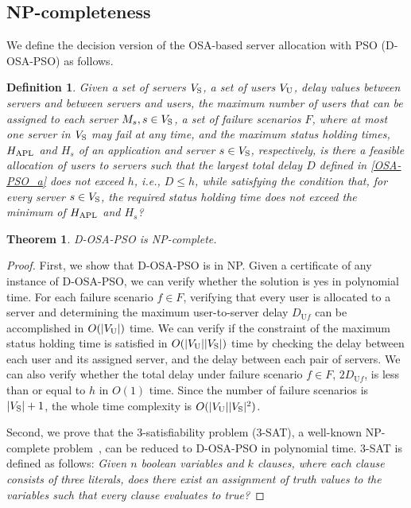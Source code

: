 \documentclass[conference]{IEEEtran}
\newtheorem{thm}{Theorem} %
\newtheorem{definition}{Definition}
\begin{document}
\begin{CJK}{UTF8}{ipxm}
\section{NP-completeness}
\label{sec:NP-Completeness}

We define the decision version of the OSA-based server allocation with PSO (D-OSA-PSO) as follows.
\begin{definition}
    Given a set of servers $V_{\rm{S}}$, a set of users $V_{\rm{U}}$, delay values between servers and between servers and users, the maximum number of users that can be assigned to each server $M_s, s \in V_{\rm{S}}$, a set of failure scenarios $F$, where at most one server in $V_{\rm{S}}$ may fail at any time, 
    and the maximum status holding times, $H_{\rm APL}$ and $H_s$ of an application and server $s \in V_{\rm{S}}$, respectively, 
    is there a feasible allocation of users to servers such that the largest total delay $D$ defined in \eqref{OSA-PSO_a} does not exceed $h$, i.e., $D \leq h$, while satisfying the condition that, for every server $s \in V_{\rm{S}}$, the required status holding time does not exceed the minimum of $H_{\rm APL}$ and $H_s$?
\end{definition}
\begin{thm}
D-OSA-PSO is NP-complete.
\end{thm}
\begin{proof}
  First, we show that D-OSA-PSO is in NP.
  Given a certificate of any instance of D-OSA-PSO, we can verify whether the solution is yes in polynomial time.  %
  For each failure scenario $f \in F$, verifying that every user is allocated to a server and determining the maximum user-to-server delay $D_{\mathrm{U}f}$ can be accomplished in $O(|V_{\rm{U}}|)$ time.
  We can verify if the constraint of the maximum status holding time is satisfied in $O(|V_{\rm{U}}||V_{\rm{S}}|)$ time by checking the delay between each user and its assigned server, and the delay between each pair of servers.
  We can also verify whether the total delay under failure scenario $f \in F$, $2D_{\mathrm{U}f}$, is less than or equal to $h$ in $O(1)$ time.
  Since the number of failure scenarios is $|V_{\rm{S}}|+1$, the whole time complexity is $O(|V_{\rm{U}}||V_{\rm{S}}|^2)$.

  Second, we prove that the 3-satisfiability problem (3-SAT), a well-known NP-complete problem~\cite{3_12_3SAT}, can be reduced to D-OSA-PSO in polynomial time. 
  3-SAT is defined as follows:
  {\it Given $n$ boolean variables and $k$ clauses, where each clause consists of three literals, does there exist an assignment of truth values to the variables such that every clause evaluates to true?}


\end{proof}
\end{CJK}
\end{document}
